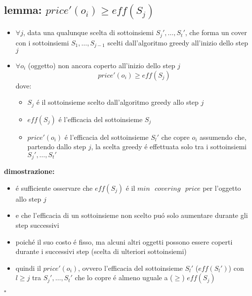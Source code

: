 \subsection*{lemma: $price'(o_i)\geq eff(S_j)$}
\begin{flushleft}
	\begin{itemize}
		\item $\forall j$, data una qualunque scelta di sottoinsiemi $S_j',\ldots,S_t'$, che forma un cover con i sottoinsiemi $S_1,\ldots,S_{j-1}$ scelti dall'algoritmo greedy all'inizio dello step $j$
		\item $\forall o_i$ (oggetto) non ancora coperto all'inizio dello step $j$
			$$price'(o_i)\geq eff(S_j)$$
		dove:
		\begin{itemize}
			\item $S_j$ \'e il sottoinsieme scelto dall'algoritmo greedy allo step $j$
			\item $eff(S_j)$ \'e l'efficacia del sottoinsieme $S_j$
			\item $price'(o_i)$ \'e l'efficacia del sottoinsieme $S_l'$ che copre $o_i$ assumendo che, partendo dallo step $j$, la scelta greedy \'e effettuata solo tra i sottoinsiemi $S_j',\ldots,S_t'$
		\end{itemize}
	\end{itemize}
	\textbf{dimostrazione:}
	\begin{itemize}
		\item \'e sufficiente osservare che $eff(S_j)$ \'e il $min\text{ }covering\text{ }price$ per l'oggetto allo step $j$ 
		\item e che l'efficacia di un sottoinsieme non scelto pu\'o solo aumentare durante gli step successivi
		\item poich\'e il suo costo \'e fisso, ma alcuni altri oggetti possono essere coperti durante i successivi step (scelta di ulteriori sottoinsiemi)
		\item quindi il $price'(o_i)$, ovvero l'efficacia del sottoinsieme $S_l'$ ($eff(S_l')$) con $l\geq j$ tra $S_j',\ldots,S_t'$ che lo copre \'e almeno uguale a ($\geq$) $eff(S_j)$
	\end{itemize}
	\hfill$\square$
\end{flushleft}


